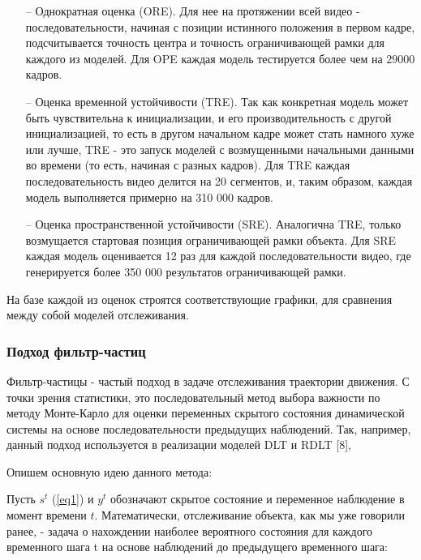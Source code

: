 \documentclass[14pt, a4paper]{article}
\begin{document}
\begin{itemize}[leftmargin=0em, itemindent=2.5 em,itemsep=1.5 pt,parsep=1.5 pt]

    \item[--] Однократная оценка (ORE). Для нее на протяжении всей видео - последовательности, начиная с позиции истинного положения в первом кадре, подсчитывается точность центра и точность ограничивающей рамки для каждого из моделей. Для OPE каждая модель тестируется более чем на $29 000$ кадров. 
    
    \item[--] Оценка временной устойчивости (TRE). Так как конкретная модель может быть чувствительна к инициализации, и его производительность с другой инициализацией, то есть в другом начальном кадре может стать намного хуже или лучше, TRE - это запуск моделей с возмущенными начальными данными во времени (то есть, начиная с разных кадров). Для TRE каждая последовательность видео делится на 20 сегментов, и, таким образом, каждая модель выполняется примерно на 310 000 кадров.
    
    \item[--] Оценка пространственной устойчивости (SRE). Аналогична TRE, только возмущается стартовая позиция ограничивающей рамки объекта. Для SRE каждая модель оценивается 12 раз для каждой последовательности видео, где генерируется более 350 000 результатов ограничивающей рамки. 
    
\end{itemize}

На базе каждой из оценок строятся соответствующие графики, для сравнения между собой моделей отслеживания.

\subsubsection{Подход фильтр-частиц} \label{filter-partical}

Фильтр-частицы - частый подход в задаче отслеживания траектории движения. С точки зрения статистики, это последовательный метод выбора важности по методу Монте-Карло для оценки переменных скрытого состояния динамической системы на основе последовательности предыдущих наблюдений. Так, например, данный подход используется в реализации моделей DLT  и RDLT [8], 

Опишем основную идею данного метода:

Пусть $s^{t}$ (\ref{eq1}) и $y^{t}$ обозначают скрытое состояние и переменное наблюдение в момент времени $t$. Математически, отслеживание объекта, как мы уже говорили ранее, - задача о нахождении наиболее вероятного состояния для каждого временного шага t на основе наблюдений до предыдущего временного шага:
\end{document}
